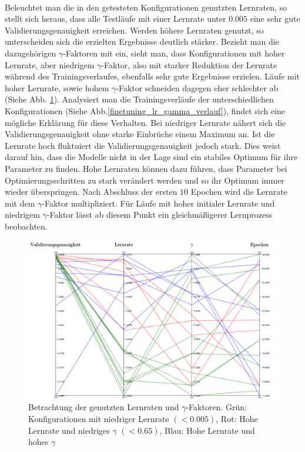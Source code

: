 \\
Beleuchtet man die in den getesteten Konfigurationen genutzten Lernraten, so stellt sich heraus, dass alle Testläufe mit einer Lernrate unter $0.005$ eine sehr gute Validierungsgenauigkeit erreichen. Werden höhere Lernraten genutzt, so unterscheiden sich die erzielten Ergebnisse deutlich stärker. Bezieht man die dazugehörigen $\gamma$-Faktoren mit ein, sieht man, dass Konfigurationen mit hoher Lernrate, aber niedrigem $\gamma$-Faktor, also mit starker Reduktion der Lernrate während des Trainingsverlaufes, ebenfalls sehr gute Ergebnisse erzielen. Läufe mit hoher Lernrate, sowie hohem $\gamma$-Faktor schneiden dagegen eher schlechter ab (Siehe Abb. \ref{finetuning_lr_gamma}). Analysiert man die Trainingsverläufe der unterschiedlichen Konfigurationen (Siehe Abb.\ref{finetuning_lr_gamma_verlauf}), findet sich eine mögliche Erklärung für diese Verhalten. Bei niedriger Lernrate nähert sich die Validierungsgenauigkeit ohne starke Einbrüche einem Maximum an. Ist die Lernrate hoch fluktuiert die Validierungsgenauigkeit jedoch stark. Dies weist darauf hin, dass die Modelle nicht in der Lage sind ein stabiles Optimum für ihre Parameter zu finden. Hohe Lernraten können dazu führen, dass Parameter bei Optimierungsschritten zu stark verändert werden und so ihr Optimum immer wieder überspringen. Nach Abschluss der ersten $10$ Epochen wird die Lernrate mit dem $\gamma$-Faktor multipliziert. Für Läufe mit hoher initialer Lernrate und niedrigem $\gamma$-Faktor lässt ab diesem Punkt ein gleichmäßigerer Lernprozess beobachten. 
\begin{figure}[h]
\includegraphics[scale=0.6]{NNOPT/finetuning_lr_gamma.pdf}
\caption{Betrachtung der genutzten Lernraten und $\gamma$-Faktoren. Grün: Konfigurationen mit niedriger Lernrate $(<0.005)$, Rot: Hohe Lernrate und niedriges $\gamma$ $(<0.65)$, Blau: Hohe Lernrate und hohes $\gamma$}
\label{finetuning_lr_gamma}
\end{figure}
